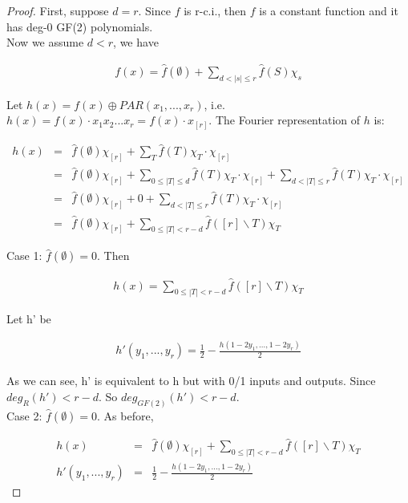 \documentclass[12pt]{article}
\begin{document}
\begin{proof}
First, suppose $d = r$. Since $f$ is r-c.i., then $f$ is a constant
function and it has deg-0 GF(2) polynomials. \\

Now we assume $d < r$, we have

\begin{eqnarray*}
f(x) = \hat {f}(\emptyset) + \sum_{d < |s| \le r} {\hat {f}(S)\chi_s}
\end{eqnarray*}

Let $h(x) = f(x) \oplus PAR(x_1,...,x_r)$, i.e. $h(x) = f(x) \cdot
x_1x_2...x_r = f(x) \cdot x_{[r]}$. The Fourier representation of $h$
is:

\begin{eqnarray*}
h(x) 
&=& \hat {f}(\emptyset) \chi_{[r]} + \sum_T {\hat {f}(T) \chi_T
  \cdot \chi_{[r]}} \\
&=& \hat {f}(\emptyset) \chi_{[r]} + \sum_{0 \le |T| \le d} {\hat
  {f}(T) \chi_T \cdot \chi_{[r]}} + \sum_{d < |T| \le r} {\hat
  {f}(T) \chi_T \cdot \chi_{[r]}} \\
&=& \hat {f}(\emptyset) \chi_{[r]} + 0 + \sum_{d < |T| \le r}
{\hat {f}(T) \chi_T \cdot \chi_{[r]}} \\
&=& \hat {f}(\emptyset) \chi_{[r]} + \sum_{0 \le |T| < r-d} {\hat
  {f}([r] \backslash T) \chi_T}
\end{eqnarray*}

Case 1: $\hat {f}(\emptyset) = 0$. Then

\begin{eqnarray*}
h(x) = \sum_{0 \le |T| < r-d} {\hat {f}([r] \backslash T) \chi_T}
\end{eqnarray*}

Let h' be 

\begin{eqnarray*}
h'(y_1,...,y_r) = \frac {1}{2} - \frac {h(1 - 2y_1, ..., 1 - 2y_r)}{2}
\end{eqnarray*}

As we can see, h' is equivalent to h but with 0/1 inputs and
outputs. Since $deg_R(h') < r-d$. So $deg_{GF(2)}(h') < r-d$. \\

Case 2: $\hat {f}(\emptyset) = 0$. As before,

\begin{eqnarray*}
h(x) &=& \hat {f}(\emptyset) \chi_{[r]} + \sum_{0 \le |T| < r-d} {\hat
  {f}([r] \backslash T) \chi_T} \\
h'(y_1,...,y_r) &=& \frac {1}{2} - \frac {h(1 - 2y_1, ..., 1 -
  2y_r)}{2}
\end{eqnarray*}


\end{proof}
\end{document}
